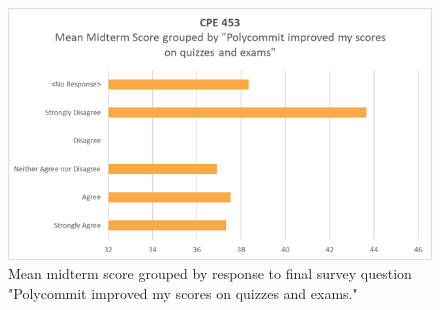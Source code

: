 \begin{figure}[h]
	\includegraphics[width=1.0\linewidth]{figures/improved-vs-score}
	\caption{Mean midterm score grouped by response to final survey question "Polycommit improved my scores on quizzes and exams."}
	\label{fig:overconfidence}
\end{figure}




 